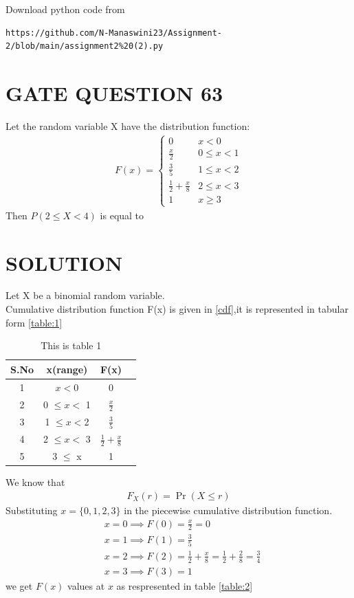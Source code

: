 \documentclass[journal,12pt,twocolumn]{IEEEtran}
\begin{document}
\renewcommand{\thefigure}{\theenumi}
\renewcommand{\thetable}{\theenumi}
Download python code from 
\begin{lstlisting}
https://github.com/N-Manaswini23/Assignment-2/blob/main/assignment2%20(2).py
\end{lstlisting}
%

\section*{GATE QUESTION 63}
Let the random variable X have the distribution function:
\begin{align}
F(x) = \begin{cases}
0 & x < 0
\\
\frac{x}{2} & 0 \leq x < 1 
\\
\frac{3}{5} & 1 \leq x < 2
\\
\frac{1}{2}+\frac{x}{8} & 2 \leq x < 3
\\
1 & x \geq 3
\end{cases} \label{cdf}
\end{align}
Then $P (2 \leq X < 4)$ is equal to


\section*{SOLUTION}
Let X be a binomial random variable. \\
Cumulative distribution function F(x) is given in \eqref{cdf},it is represented in tabular form \eqref{table:1}


\begin{table}[h!]
\resizebox{7cm}{!}
{ 
\begin{tabular}{|c|c|c|c|}
\hline
S.No & x(range) & F(x) \\
\hline
1 & $x < 0$ & 0 \\
\hline
2 & 0 $\leq x < $ 1 & $\frac{x}{2}$\\
\hline
3 & 1 $\leq  x < $2 & $\frac{3}{5}$\\
\hline
4 & 2 $\leq x  < $ 3 & $\frac{1}{2}+\frac{x}{8}$  \\
\hline
5 & 3 $\leq$ x & 1\\
\hline
\end{tabular} 
}
\caption{This is table 1}
\label{table:1}
\end{table}
We know that
\begin{align}
F_X(r) = \Pr (X \leq r) 
\end{align}
Substituting $x=\{0,1,2,3\}$ in the piecewise cumulative distribution function.\\
\begin{align}
&x=0 \implies F(0)=\frac{x}{2}=0\\
&x=1 \implies F(1)=\frac{3}{5}\\
&x=2 \implies F(2)=\frac{1}{2}+\frac{x}{8}=\frac{1}{2}+\frac{2}{8}=\frac{3}{4}\\
&x=3 \implies F(3)=1 \label{1}
\end{align}
we get $F(x)$ values at $x$ as respresented in table \eqref{table:2}
\end{document}
